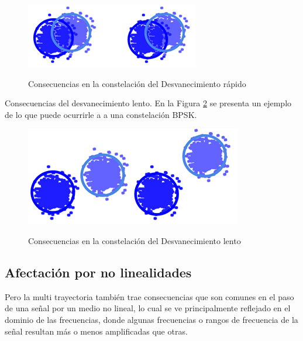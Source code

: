 \begin{figure}[h!]
	\captionsetup{justification = raggedright, singlelinecheck = false}
	\caption{Consecuencias en la constelación del Desvanecimiento rápido} 
	\centering
	\includegraphics[scale=1]{Imagenes/Circulos.png}
	\label{fig:Circulos}
\end{figure}

Consecuencias del desvanecimiento lento. En la Figura \ref{fig:Variacion} se presenta un ejemplo de lo que puede ocurrirle a a una constelación BPSK.\\

\begin{figure}[h!]
	\captionsetup{justification = raggedright, singlelinecheck = false}
	\caption{Consecuencias en la constelación del Desvanecimiento lento} 
	\centering
	\includegraphics[scale=1]{Imagenes/Variacion.png}
	\label{fig:Variacion}
\end{figure}



\subsection{Afectación por no linealidades}

Pero la multi trayectoria también trae consecuencias que son comunes en el paso de una señal por un medio no lineal, lo cual se ve principalmente reflejado en el dominio de las frecuencias, donde algunas frecuencias o rangos de frecuencia de la señal resultan más o menos amplificadas que otras.\\

